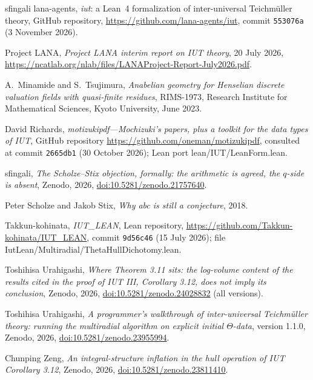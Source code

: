 \documentclass[11pt,a4paper]{article}
\newcommand{\leanus}{\textunderscore\allowbreak}
\newcommand{\lean}[1]{{\ttfamily\let\_\leanus #1}}
\theoremstyle{plain}
\theoremstyle{definition}
\theoremstyle{remark}
\begin{document}
\begin{thebibliography}{sfingali}
lana-agents, \emph{iut}: a Lean~4 formalization of inter-universal {T}eichm\"uller theory, GitHub repository,
\url{https://github.com/lana-agents/iut}, commit \texttt{553076a} (3 November 2026).

Project LANA, \emph{Project LANA interim report on IUT theory}, 20 July 2026,
\url{https://ncatlab.org/nlab/files/LANAProject-Report-July2026.pdf}.

A.~Minamide and S.~Tsujimura, \emph{Anabelian geometry for {H}enselian discrete valuation fields with quasi-finite
residues}, RIMS-1973, Research Institute for Mathematical Sciences, Kyoto University, June 2023.

David Richards, \emph{motizukipdf---{M}ochizuki's papers, plus a toolkit for the data types of {IUT}}, GitHub
repository \url{https://github.com/oneman/motizukipdf}, consulted at commit \texttt{2665db1} (30 October 2026); Lean port
\lean{lean/IUT/LeanForm.lean}.

sfingali, \emph{The {S}cholze--{S}tix objection, formally: the arithmetic is agreed, the $q$-side is absent}, Zenodo,
2026, \href{https://doi.org/10.5281/zenodo.21757640}{doi:10.5281/zenodo.21757640}.

Peter Scholze and Jakob Stix, \emph{Why abc is still a conjecture}, 2018.

Takkun-kohinata, \emph{IUT\_LEAN}, Lean repository, \url{https://github.com/Takkun-kohinata/IUT_LEAN}, commit
\texttt{9d56c46} (15 July 2026); file \lean{IutLean/Multiradial/ThetaHullDichotomy.lean}.

Toshihisa Urahigashi, \emph{Where Theorem 3.11 sits: the log-volume content of the results cited in the proof of IUT
III, Corollary 3.12, does not imply its conclusion}, Zenodo, 2026,
\href{https://doi.org/10.5281/zenodo.24028832}{doi:10.5281/zenodo.24028832} (all versions).

Toshihisa Urahigashi, \emph{A programmer's walkthrough of inter-universal {T}eichm\"uller theory: running the
multiradial algorithm on explicit initial $\Theta$-data}, version 1.1.0, Zenodo, 2026,
\href{https://doi.org/10.5281/zenodo.23955994}{doi:10.5281/zenodo.23955994}.

Chunping Zeng, \emph{An integral-structure inflation in the hull operation of {IUT} {C}orollary 3.12}, Zenodo, 2026,
\href{https://doi.org/10.5281/zenodo.23811410}{doi:10.5281/zenodo.23811410}.
\end{thebibliography}
\end{document}
